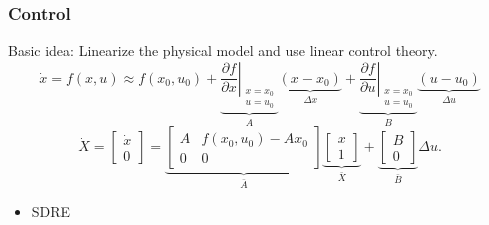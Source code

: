\documentclass{beamer}
\begin{document}
\begin{frame}
    \frametitle{Control}
    Basic idea: Linearize the physical model and use linear control theory.
    \tiny
    \begin{equation}
        \dot{x} = f(x,u) \approx f(x_{0},u_{0})
            + \underbrace{\left. \frac{\partial f}{\partial x} \right|_{
                \begin{array}{l}
                    x=x_{0} \\
                    u=u_{0}
                \end{array}
            }}_{A}
                \underbrace{\left( x-x_{0} \right)}_{\Delta x}
            + \underbrace{\left. \frac{\partial f}{\partial u} \right|_{
                \begin{array}{l}
                    x=x_{0} \\
                    u=u_{0}
                \end{array}
            }}_{B}
                \underbrace{\left( u-u_{0} \right)}_{\Delta u}
    \end{equation}
    \begin{equation}
    \label{eq:controller:affinelq}
        \dot{X} = \left[
        \begin{array}{c}
            \dot{x} \\
            0
        \end{array}\right] =
        \underbrace{\left[
        \begin{array}{cc}
            A & f(x_{0},u_{0})-Ax_{0} \\
            0 & 0
        \end{array}\right]}_{\bar{A}}
        \underbrace{\left[
        \begin{array}{c}
            x \\
            1
        \end{array}\right]}_{\bar{X}}
        +
        \underbrace{\left[
        \begin{array}{c}
            B \\
            0
        \end{array}\right]}_{\bar{B}}
        \Delta u.
    \end{equation}
    \begin{itemize}
        \item SDRE
    \end{itemize}
\end{frame}
\end{document}
